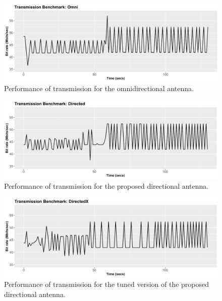 \documentclass[12pt, oneandhalf, chaparabic, sees, ms]{metu}
\begin{document}
\begin{figure}[!htbp]
 \begin{center}
  \includegraphics[width=\textwidth]{omni-tx-graph-bw.png}
 \end{center}
 \caption{Performance of transmission for the omnidirectional antenna.}
  \label{fig:omni-tx-bench}
\end{figure}


\vspace{-0.5cm}


\begin{figure}[!htbp]
 \begin{center}
  \includegraphics[width=\textwidth]{directed-tx-graph-bw.png}
 \end{center}
 \caption{Performance of transmission for the proposed directional antenna.}
  \label{fig:dir-tx-bench}
\end{figure}

\vspace{-0.5cm}

\begin{figure}[!htbp]
 \begin{center}
  \includegraphics[width=\textwidth]{directedx-tx-graph-bw.png}
 \end{center}
 \caption{Performance of transmission for the tuned version of the proposed directional antenna.}
  \label{fig:dirx-tx-bench}
\end{figure}
\end{document}
